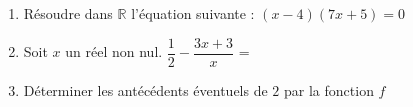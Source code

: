 \documentclass[a4paper,11pt]{article}
\begin{document}
\begin{seanceD}{} %

\begin{enumerate}
\item Résoudre dans $\mathbb R$ l'équation suivante : $(x-4)(7x+5)=0$ \dotfill

\dotfill

\dotfill
\item Soit $x$ un réel non nul. $\dfrac{1}{2}-\dfrac{3x+3}{x}$  = \dotfill

\dotfill

\dotfill

\item Déterminer les antécédents éventuels de $2$ par la fonction $f$ \dotfill
\begin{center}

\begin{tikzpicture}[baseline,scale = 0.75]


\end{tikzpicture}
\end{center}
\end{enumerate}
\end{seanceD}
\end{document}
